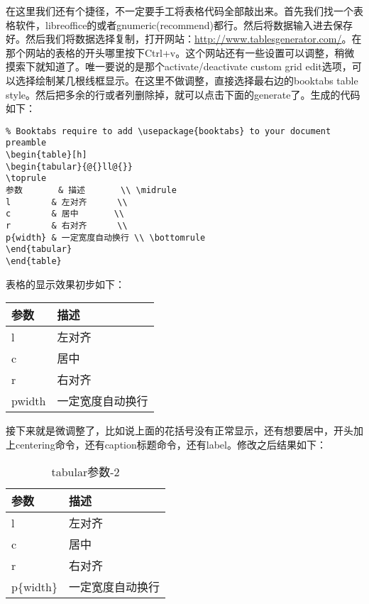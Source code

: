 在这里我们还有个捷径，不一定要手工将表格代码全部敲出来。首先我们找一个表格软件，libreoffice的或者gnumeric(recommend)都行。然后将数据输入进去保存好。然后我们将数据选择复制，打开网站：\href{http://www.tablesgenerator.com/}{http://www.tablesgenerator.com/}。在那个网站的表格的开头哪里按下Ctrl+v。这个网站还有一些设置可以调整，稍微摸索下就知道了。唯一要说的是那个activate/deactivate custom grid edit选项，可以选择绘制某几根线框显示。在这里不做调整，直接选择最右边的booktabs table style。然后把多余的行或者列删除掉，就可以点击下面的generate了。生成的代码如下：
\begin{verbatim}
% Booktabs require to add \usepackage{booktabs} to your document preamble
\begin{table}[h]
\begin{tabular}{@{}ll@{}}
\toprule
参数       & 描述       \\ \midrule
l        & 左对齐      \\
c        & 居中       \\
r        & 右对齐      \\
p{width} & 一定宽度自动换行 \\ \bottomrule
\end{tabular}
\end{table}
\end{verbatim}
表格的显示效果初步如下：
\begin{table}[h]
\begin{tabular}{@{}ll@{}}
\toprule
参数       & 描述       \\ \midrule
l        & 左对齐      \\
c        & 居中       \\
r        & 右对齐      \\
p{width} & 一定宽度自动换行 \\ \bottomrule
\end{tabular}
\end{table}

接下来就是微调整了，比如说上面的花括号没有正常显示，还有想要居中，开头加上centering命令，还有caption标题命令，还有label。修改之后结果如下：
\begin{table}[h]
\centering
\begin{tabular}{@{}ll@{}}
\toprule[1.2pt]
参数       & 描述       \\ \midrule
l        & 左对齐      \\
c        & 居中       \\
r        & 右对齐      \\
p\{width\} & 一定宽度自动换行 \\ \bottomrule[1.2pt]
\end{tabular}
\caption{tabular参数-2}
\label{tab:tabular参数-2}
\end{table}

